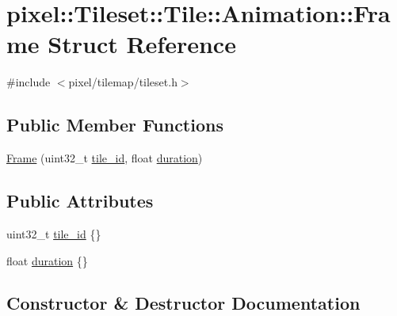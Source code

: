 \hypertarget{structpixel_1_1_tileset_1_1_tile_1_1_animation_1_1_frame}{}\section{pixel\+:\+:Tileset\+:\+:Tile\+:\+:Animation\+:\+:Frame Struct Reference}
\label{structpixel_1_1_tileset_1_1_tile_1_1_animation_1_1_frame}


{\ttfamily \#include $<$pixel/tilemap/tileset.\+h$>$}

\subsection*{Public Member Functions}
\begin{DoxyCompactItemize}
\item 
\hyperlink{structpixel_1_1_tileset_1_1_tile_1_1_animation_1_1_frame_adeddbef70f055146c5996c7e23b4ad29}{Frame} (uint32\+\_\+t \hyperlink{structpixel_1_1_tileset_1_1_tile_1_1_animation_1_1_frame_ac6399710628ccbf534b19b439a33aa81}{tile\+\_\+id}, float \hyperlink{structpixel_1_1_tileset_1_1_tile_1_1_animation_1_1_frame_ad0960c88d6e0ced5743a22809b922b6e}{duration})
\end{DoxyCompactItemize}
\subsection*{Public Attributes}
\begin{DoxyCompactItemize}
\item 
uint32\+\_\+t \hyperlink{structpixel_1_1_tileset_1_1_tile_1_1_animation_1_1_frame_ac6399710628ccbf534b19b439a33aa81}{tile\+\_\+id} \{\}
\item 
float \hyperlink{structpixel_1_1_tileset_1_1_tile_1_1_animation_1_1_frame_ad0960c88d6e0ced5743a22809b922b6e}{duration} \{\}
\end{DoxyCompactItemize}


\subsection{Constructor \& Destructor Documentation}
\mbox{\label{structpixel_1_1_tileset_1_1_tile_1_1_animation_1_1_frame_adeddbef70f055146c5996c7e23b4ad29}} 
